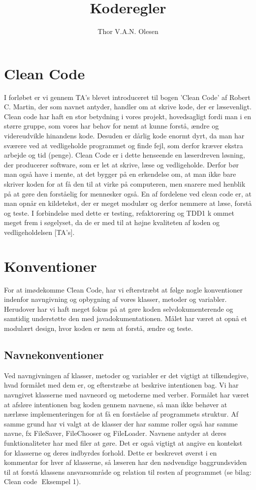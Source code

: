 \documentclass{article}
\title{Koderegler}
\author{Thor V.A.N. Olesen}
\begin{document}
	
\maketitle
{}

\section{Clean Code}
I forløbet er vi gennem TA’s blevet introduceret til bogen ’Clean Code’ af Robert C. Martin, der som navnet antyder, handler om at skrive kode, der er læsevenligt. Clean code har haft en stor betydning i vores projekt, hovedsagligt fordi man i en større gruppe, som vores har behov for nemt at kunne forstå, ændre og videreudvikle hinandens kode. Desuden er dårlig kode enormt dyrt, da man har sværere ved at vedligeholde programmet og finde fejl, som derfor kræver ekstra arbejde og tid (penge). Clean Code er i dette henseende en læserdreven løsning, der producerer software, som er let at skrive, læse og vedligeholde. Derfor bør man også have i mente, at det bygger på en erkendelse om, at man ikke bare skriver koden for at få den til at virke på computeren, men snarere med henblik på at gøre den forståelig for mennesker også. En af fordelene ved clean code er, at man opnår en kildetekst, der er meget modulær og derfor nemmere at læse, forstå og teste. I forbindelse med dette er testing, refaktorering og TDD1 k ommet meget frem i søgelyset, da de er med til at højne kvaliteten af koden og vedligeholdelsen [TA’s].

\section{Konventioner}
For at imødekomme Clean Code, har vi efterstræbt at følge nogle konventioner indenfor navngivning og opbygning af vores klasser, metoder og variabler. Herudover har vi haft meget fokus på at gøre koden selvdokumenterende og samtidig understøtte den med javadokumentationen. Målet har været at opnå et modulært design, hvor koden er nem at forstå, ændre og teste.

\newpage

\subsection{Navnekonventioner}
Ved navngivningen af klasser, metoder og variabler er det vigtigt at tilkendegive, hvad formålet med dem er, og efterstræbe at beskrive intentionen bag. Vi har navngivet klasserne med navneord og metoderne med verber. Formålet har været at afsløre intentionen bag koden gennem navnene, så man ikke behøver at nærlæse implementeringen for at få en forståelse af programmets struktur.
Af samme grund har vi valgt at de klasser der har samme roller også har samme navne, fx FileSaver, FileChooser og FileLoader. Navnene antyder at deres funktionaliteter har med filer at gøre. Det er også vigtigt at angive en kontekst for klasserne og deres indbyrdes forhold. Dette er beskrevet øverst i en kommentar for hver af klasserne, så læseren har den nødvendige baggrundsviden til at forstå klassens ansvarsområde og relation til resten af programmet (se bilag: Clean code ­ Eksempel 1).
\end{document}
